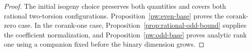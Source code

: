 \begin{proof}
The initial isogeny choice preserves both quantities and covers both
rational two-torsion configurations.  Proposition~\ref{pw:even-base}
proves the corank-zero case.  In the corank-one case,
Proposition~\ref{prop:rational-odd-bound} supplies the coefficient
normalization, and Proposition~\ref{pw:odd-base} proves analytic rank one
using a companion fixed before the binary dimension grows.
\end{proof}
